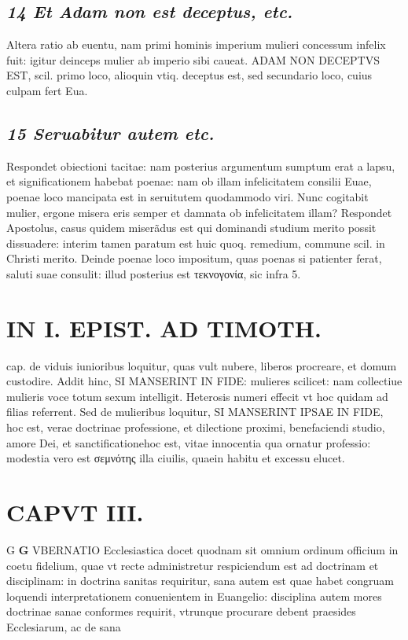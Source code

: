 \documentclass{article}
\begin{document}
\begin{pages}
\subsection*{\textit{14 Et Adam non est deceptus, etc. }}\pstart Altera ratio ab euentu, nam primi hominis imperium mulieri concessum infelix fuit: igitur deinceps mulier ab imperio sibi caueat. ADAM NON DECEPTVS EST, scil. primo loco, alioquin vtiq. deceptus est, sed secundario loco, cuius culpam fert Eua.  \pend
{}
{}
\subsection*{\textit{15 Seruabitur autem etc. }}\pstart Respondet obiectioni tacitae: nam posterius argumentum sumptum erat a lapsu, et significationem habebat poenae: nam ob illam infelicitatem consilii Euae, poenae loco mancipata est in seruitutem quodammodo viri. Nunc cogitabit mulier, ergone misera eris semper et damnata ob infelicitatem illam? Respondet Apostolus, casus quidem miserãdus est qui dominandi studium merito possit dissuadere: interim tamen paratum est huic quoq. remedium, commune scil. in Christi merito. Deinde poenae loco impositum, quas poenas si patienter ferat, saluti suae consulit: illud posterius est τεκνογονία, sic infra 5.  \pend
\section*{IN I. EPIST. AD TIMOTH. }
\marginpar{[ p.59 ]}\pstart cap. de viduis iunioribus loquitur, quas vult nubere, liberos procreare, et domum custodire. Addit hinc, SI MANSERINT IN FIDE: mulieres scilicet: nam collectiue mulieris voce totum sexum intelligit. Heterosis numeri effecit vt hoc quidam ad filias referrent. Sed de mulieribus loquitur, SI MANSERINT IPSAE IN FIDE, hoc est, verae doctrinae professione, et dilectione proximi, benefaciendi studio, amore Dei, et sanctificationehoc est, vitae innocentia qua ornatur professio: modestia vero est σεμνότης illa ciuilis, quaein habitu et excessu elucet.  \pend
\endnumbering\beginnumbering\section{CAPVT III.}G \pstart \textbf{G} VBERNATIO Ecclesiastica docet quodnam sit omnium ordinum officium in coetu fidelium, quae vt recte administretur respiciendum est ad doctrinam et disciplinam: in doctrina sanitas requiritur, sana autem est quae habet congruam loquendi interpretationem conuenientem in Euangelio: disciplina autem mores doctrinae sanae conformes requirit, vtrunque procurare debent praesides Ecclesiarum, ac de sana  \pend

\end{pages}
\end{document}
